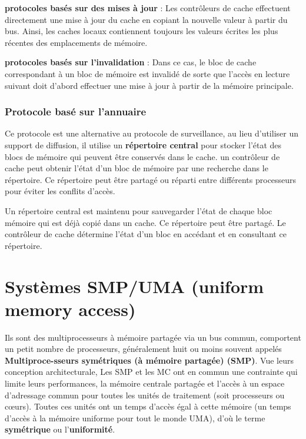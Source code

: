 \textbf{protocoles basés sur des mises à jour} :
Les contrôleurs de cache effectuent directement une mise à jour du cache en copiant la nouvelle valeur à partir du bus. 
Ainsi, les caches locaux contiennent toujours les valeurs écrites les plus récentes des emplacements de mémoire. 

\textbf{protocoles basés sur l'invalidation} :
Dans ce cas, le bloc de cache correspondant à un bloc de mémoire 
est invalidé de sorte que l'accès en lecture suivant doit d'abord effectuer une mise à jour à partir de la mémoire principale. \cite{Tan02}
%
\subsubsection{Protocole basé sur l'annuaire}
%
Ce protocole est une alternative au protocole de surveillance, au lieu d'utiliser un support de diffusion, il utilise un \textbf{répertoire central} pour stocker l'état des blocs de mémoire qui peuvent être conservés dans le cache. 
un contrôleur de cache peut obtenir l'état d'un bloc de mémoire par une recherche dans le répertoire. 
Ce répertoire peut être partagé ou réparti entre différents processeurs pour éviter les conflits d'accès. \cite{Culler99}

Un répertoire central est maintenu pour sauvegarder l'état de chaque bloc mémoire qui est déjà copié dans un cache. Ce répertoire peut être partagé. Le contrôleur de cache détermine l'état d'un  bloc en accédant et en consultant ce répertoire.

\section{Systèmes SMP/UMA (uniform memory access)}
%
Ils sont des multiprocesseurs à mémoire partagée via un bus commun, comportent un petit nombre de processeurs, généralement huit ou moins souvent appelés \textbf{Multiproce-sseurs symétriques (à mémoire partagée) (SMP)}.
Vue leurs conception architecturale, Les SMP et les MC ont en commun une contrainte qui limite leurs performances, la mémoire centrale partagée et l'accès à un espace d'adressage commun pour toutes les unités de traitement (soit processeurs ou cœurs). 
Toutes ces unités ont un temps d'accès égal à cette mémoire (un temps d'accès à la mémoire uniforme pour tout le monde UMA), d'où le terme \textbf{symétrique} ou l'\textbf{uniformité}. 

